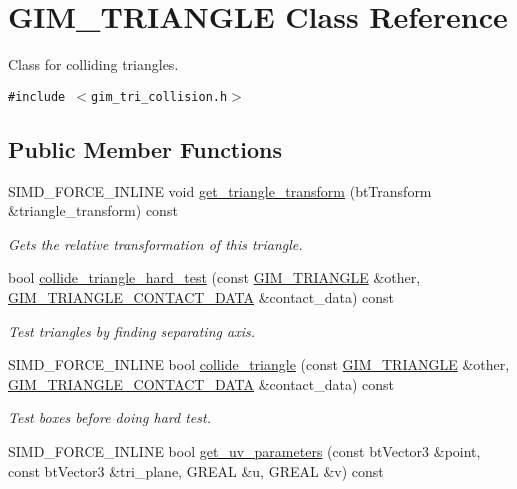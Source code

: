 \hypertarget{class_g_i_m___t_r_i_a_n_g_l_e}{
\section{GIM\_\-TRIANGLE Class Reference}
\label{class_g_i_m___t_r_i_a_n_g_l_e}
}
Class for colliding triangles.  


{\tt \#include $<$gim\_\-tri\_\-collision.h$>$}

\subsection*{Public Member Functions}
\begin{CompactItemize}
\item 
SIMD\_\-FORCE\_\-INLINE void \hyperlink{class_g_i_m___t_r_i_a_n_g_l_e_500db747a4c740b3de1756336263a53d}{get\_\-triangle\_\-transform} (btTransform \&triangle\_\-transform) const 
\begin{CompactList}\small\item\em Gets the relative transformation of this triangle. \item\end{CompactList}\item 
bool \hyperlink{class_g_i_m___t_r_i_a_n_g_l_e_0ec3d21ba17dec3cfecbe8ff34b85072}{collide\_\-triangle\_\-hard\_\-test} (const \hyperlink{class_g_i_m___t_r_i_a_n_g_l_e}{GIM\_\-TRIANGLE} \&other, \hyperlink{struct_g_i_m___t_r_i_a_n_g_l_e___c_o_n_t_a_c_t___d_a_t_a}{GIM\_\-TRIANGLE\_\-CONTACT\_\-DATA} \&contact\_\-data) const 
\begin{CompactList}\small\item\em Test triangles by finding separating axis. \item\end{CompactList}\item 
SIMD\_\-FORCE\_\-INLINE bool \hyperlink{class_g_i_m___t_r_i_a_n_g_l_e_42749c17088408842a97534559b9d1f2}{collide\_\-triangle} (const \hyperlink{class_g_i_m___t_r_i_a_n_g_l_e}{GIM\_\-TRIANGLE} \&other, \hyperlink{struct_g_i_m___t_r_i_a_n_g_l_e___c_o_n_t_a_c_t___d_a_t_a}{GIM\_\-TRIANGLE\_\-CONTACT\_\-DATA} \&contact\_\-data) const 
\begin{CompactList}\small\item\em Test boxes before doing hard test. \item\end{CompactList}\item 
SIMD\_\-FORCE\_\-INLINE bool \hyperlink{class_g_i_m___t_r_i_a_n_g_l_e_cbd27931f5431435ecce5576de18924b}{get\_\-uv\_\-parameters} (const btVector3 \&point, const btVector3 \&tri\_\-plane, GREAL \&u, GREAL \&v) const 

\end{CompactItemize}

